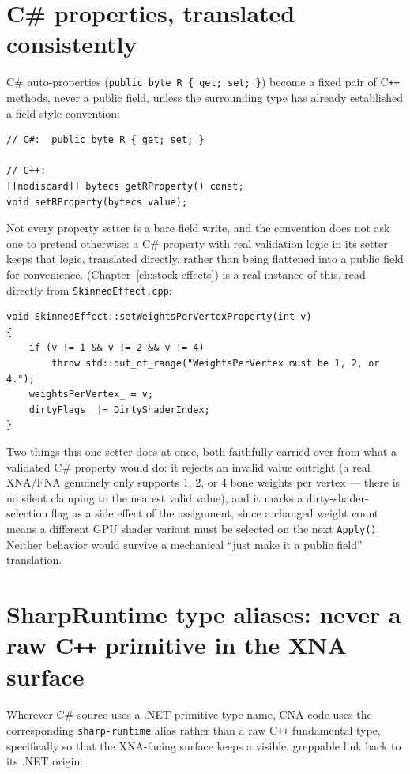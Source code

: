 \section{C\# properties, translated consistently}

C\# auto-properties (\texttt{public byte R \{ get; set; \}}) become a fixed pair of C\texttt{++}
methods, never a public field, unless the surrounding type has already established a
field-style convention:

\begin{lstlisting}
// C#:  public byte R { get; set; }

// C++:
[[nodiscard]] bytecs getRProperty() const;
void setRProperty(bytecs value);
\end{lstlisting}

Not every property setter is a bare field write, and the convention does not ask one to
pretend otherwise: a C\# property with real validation logic in its setter keeps that logic,
translated directly, rather than being flattened into a public field for convenience.
 (Chapter~\ref{ch:stock-effects}) is a real instance
of this, read directly from \texttt{SkinnedEffect.cpp}:

\begin{lstlisting}
void SkinnedEffect::setWeightsPerVertexProperty(int v)
{
    if (v != 1 && v != 2 && v != 4)
        throw std::out_of_range("WeightsPerVertex must be 1, 2, or 4.");
    weightsPerVertex_ = v;
    dirtyFlags_ |= DirtyShaderIndex;
}
\end{lstlisting}

Two things this one setter does at once, both faithfully carried over from what a validated
C\# property would do: it rejects an invalid value outright (a real XNA/FNA
 genuinely only supports 1, 2, or 4 bone weights per vertex --- there is
no silent clamping to the nearest valid value), and it marks a dirty-shader-selection flag as a
side effect of the assignment, since a changed weight count means a different GPU shader
variant must be selected on the next \texttt{Apply()}. Neither behavior would survive a
mechanical ``just make it a public field'' translation.

\section{SharpRuntime type aliases: never a raw C\texttt{++} primitive in the XNA surface}

Wherever C\# source uses a .NET primitive type name, CNA code uses the corresponding
\texttt{sharp-runtime} alias rather than a raw C\texttt{++} fundamental type, specifically so
that the XNA-facing surface keeps a visible, greppable link back to its .NET origin:

